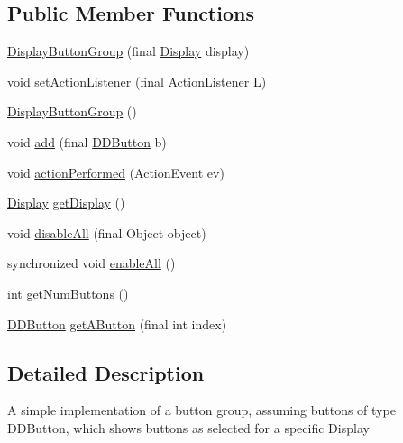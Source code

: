 \subsection*{Public Member Functions}
\begin{DoxyCompactItemize}
\item 
\hyperlink{classgov_1_1fnal_1_1ppd_1_1dd_1_1util_1_1DisplayButtonGroup_a628fcdbe99086050bfb9330f5884885d}{Display\-Button\-Group} (final \hyperlink{interfacegov_1_1fnal_1_1ppd_1_1dd_1_1signage_1_1Display}{Display} display)
\item 
void \hyperlink{classgov_1_1fnal_1_1ppd_1_1dd_1_1util_1_1DisplayButtonGroup_aff590ec2454274430d3d1d4ccb4e3908}{set\-Action\-Listener} (final Action\-Listener L)
\item 
\hyperlink{classgov_1_1fnal_1_1ppd_1_1dd_1_1util_1_1DisplayButtonGroup_a003106629408dbb253941e2fcc4f072f}{Display\-Button\-Group} ()
\item 
void \hyperlink{classgov_1_1fnal_1_1ppd_1_1dd_1_1util_1_1DisplayButtonGroup_aea209fc7486f839c17551ea5d126c8b4}{add} (final \hyperlink{classgov_1_1fnal_1_1ppd_1_1dd_1_1changer_1_1DDButton}{D\-D\-Button} b)
\item 
void \hyperlink{classgov_1_1fnal_1_1ppd_1_1dd_1_1util_1_1DisplayButtonGroup_a2fdcfdeab05400e40eafe6f0afbd254b}{action\-Performed} (Action\-Event ev)
\item 
\hyperlink{interfacegov_1_1fnal_1_1ppd_1_1dd_1_1signage_1_1Display}{Display} \hyperlink{classgov_1_1fnal_1_1ppd_1_1dd_1_1util_1_1DisplayButtonGroup_a26958c7d02d984388afdce9bb0fddd66}{get\-Display} ()
\item 
void \hyperlink{classgov_1_1fnal_1_1ppd_1_1dd_1_1util_1_1DisplayButtonGroup_a5894e1f01e08a0b5f57589eeffd53367}{disable\-All} (final Object object)
\item 
synchronized void \hyperlink{classgov_1_1fnal_1_1ppd_1_1dd_1_1util_1_1DisplayButtonGroup_a75da48ccd352d5f4f2fcc59dfabee189}{enable\-All} ()
\item 
int \hyperlink{classgov_1_1fnal_1_1ppd_1_1dd_1_1util_1_1DisplayButtonGroup_ad5a3d425e222f388ee90114f83307eeb}{get\-Num\-Buttons} ()
\item 
\hyperlink{classgov_1_1fnal_1_1ppd_1_1dd_1_1changer_1_1DDButton}{D\-D\-Button} \hyperlink{classgov_1_1fnal_1_1ppd_1_1dd_1_1util_1_1DisplayButtonGroup_a4199ff481f806c60516df3447823079a}{get\-A\-Button} (final int index)
\end{DoxyCompactItemize}


\subsection{Detailed Description}
A simple implementation of a button group, assuming buttons of type D\-D\-Button, which shows buttons as selected for a specific Display

